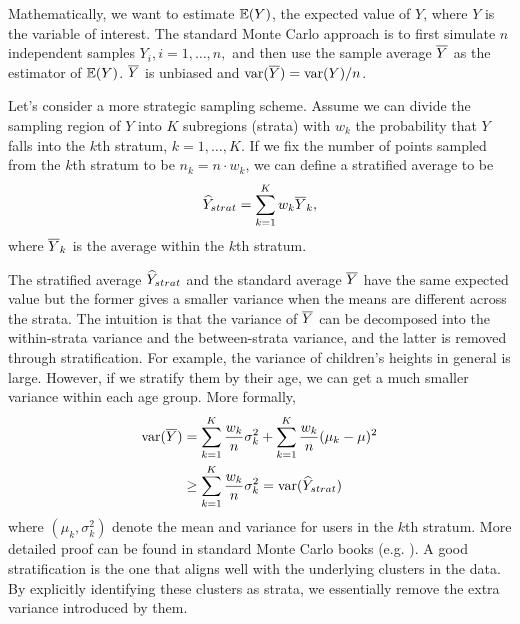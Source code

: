\documentclass{sig-alternate}
\begin{document}
Mathematically, we want to estimate $\mathbb{E}(Y)$, the expected value of $Y$, where $Y$ is the variable of interest. The standard Monte Carlo approach is to first simulate $n$ independent samples $Y_i, i=1,\dots,n,$ and then use the sample average $\overline{Y}$ as the estimator of $\mathbb{E}(Y)$. $\overline{Y}$ is unbiased and $\mathrm{var}(\overline{Y}) = \mathrm{var}(Y)/n$.

Let's consider a more strategic sampling scheme. Assume we can divide the sampling region of $Y$ into $K$ subregions (strata) with $w_k$ the probability that $Y$ falls into the $k$th stratum, $k=1,\dots,K$. If we fix the number of points sampled from the $k$th stratum to be $n_k=n\cdot w_k$, we can define a stratified average to be   
\begin{align}
\widehat{Y}_{strat} = \sum_{k=1}^K w_k\overline{Y}_k,\label{eq:stratAve}
\end{align}
where $\overline{Y}_k$ is the average within the $k$th stratum.


The stratified average $\widehat{Y}_{strat}$ and the standard average $\overline{Y}$ have the same expected value but the former gives a smaller variance when the means are different across the strata.
The intuition is that the variance of $\overline{Y}$ can be decomposed into the within-strata variance and the between-strata variance, and the latter is removed through stratification. For example, the variance of children's heights in general is large. However, if we stratify them by their age, we can get a much smaller variance within each age group. 
More formally,
\begin{align*}
\mathrm{var}(\overline{Y}) & =\sum_{k=1}^K\frac{w_k}{n}\sigma^2_k + \sum_{k=1}^K\frac{w_k}{n}(\mu_k - \mu)^2 \\
&\geq \sum_{k=1}^K\frac{w_k}{n}\sigma^2_k =\mathrm{var}(\widehat{Y}_{strat})
\end{align*}
where $(\mu_k,\sigma^2_k)$ denote the mean and variance for users in the $k$th stratum. More detailed proof can be found in standard Monte Carlo books (e.g. \cite{stosim}). 
A good stratification is the one that aligns well with the underlying clusters in the data. By explicitly identifying these clusters as strata, we essentially remove the extra variance introduced by them.

\end{document}

